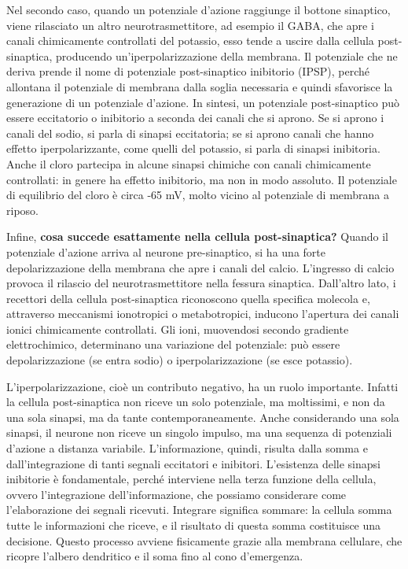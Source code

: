 Nel secondo caso, quando un potenziale d’azione raggiunge il bottone sinaptico, viene rilasciato un altro neurotrasmettitore, ad esempio il GABA, che apre i canali chimicamente controllati del potassio, esso tende a uscire dalla cellula post-sinaptica, producendo un’iperpolarizzazione della membrana. Il potenziale che ne deriva prende il nome di potenziale post-sinaptico inibitorio (IPSP), perché allontana il potenziale di membrana dalla soglia necessaria e quindi sfavorisce la generazione di un potenziale d’azione.
In sintesi, un potenziale post-sinaptico può essere eccitatorio o inibitorio a seconda dei canali che si aprono. Se si aprono i canali del sodio, si parla di sinapsi eccitatoria; se si aprono canali che hanno effetto iperpolarizzante, come quelli del potassio, si parla di sinapsi inibitoria. Anche il cloro partecipa in alcune sinapsi chimiche con canali chimicamente controllati: in genere ha effetto inibitorio, ma non in modo assoluto. Il potenziale di equilibrio del cloro è circa -65 mV, molto vicino al potenziale di membrana a riposo.

Infine, \textbf{cosa succede esattamente nella cellula post-sinaptica?}
Quando il potenziale d’azione arriva al neurone pre-sinaptico, si ha una forte depolarizzazione della membrana che apre i canali del calcio. L’ingresso di calcio provoca il rilascio del neurotrasmettitore nella fessura sinaptica. Dall’altro lato, i recettori della cellula post-sinaptica riconoscono quella specifica molecola e, attraverso meccanismi ionotropici o metabotropici, inducono l’apertura dei canali ionici chimicamente controllati. Gli ioni, muovendosi secondo gradiente elettrochimico, determinano una variazione del potenziale: può essere depolarizzazione (se entra sodio) o iperpolarizzazione (se esce potassio).

L’iperpolarizzazione, cioè un contributo negativo, ha un ruolo importante. Infatti la cellula post-sinaptica non riceve un solo potenziale, ma moltissimi, e non da una sola sinapsi, ma da tante contemporaneamente. Anche considerando una sola sinapsi, il neurone non riceve un singolo impulso, ma una sequenza di potenziali d’azione a distanza variabile. L’informazione, quindi, risulta dalla somma e dall’integrazione di tanti segnali eccitatori e inibitori.
L’esistenza delle sinapsi inibitorie è fondamentale, perché interviene nella terza funzione della cellula, ovvero l’integrazione dell’informazione, che possiamo considerare come l’elaborazione dei segnali ricevuti. Integrare significa sommare: la cellula somma tutte le informazioni che riceve, e il risultato di questa somma costituisce una decisione. Questo processo avviene fisicamente grazie alla membrana cellulare, che ricopre l’albero dendritico e il soma fino al cono d’emergenza.

